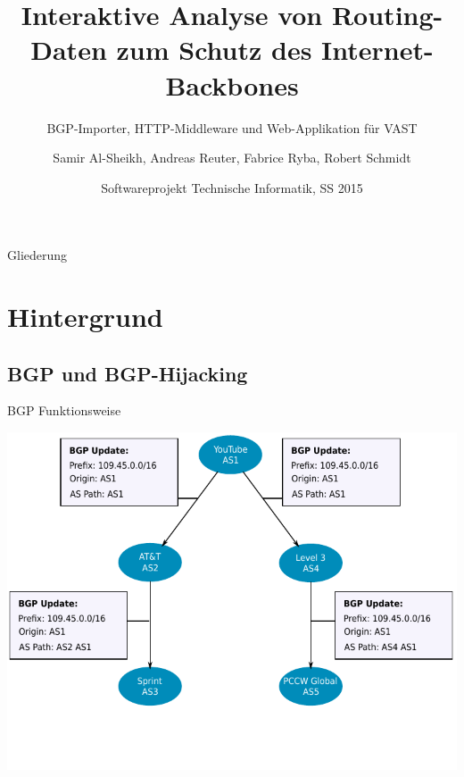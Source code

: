 \documentclass[9pt]{beamer}
\title{Interaktive Analyse von Routing-Daten zum Schutz des Internet-Backbones}
\subtitle{BGP-Importer, HTTP-Middleware und Web-Applikation für VAST}
\author{Samir Al-Sheikh, Andreas Reuter, Fabrice Ryba, Robert Schmidt}
\institute[FU Berlin]{Freie Universität Berlin}
\date[]{Softwareprojekt Technische Informatik, SS 2015}
\begin{document}
\begin{frame}
    \titlepage
\end{frame}

\begin{frame}{Gliederung}
  \tableofcontents
\end{frame}


\section{Hintergrund}

\subsection{BGP und BGP-Hijacking}

\begin{frame}{BGP Funktionsweise}{}
	\begin{center}
		\includegraphics[width=1.0\textwidth]{res/bgp_propagation.pdf}
	\end{center}
\end{frame}
\end{document}
